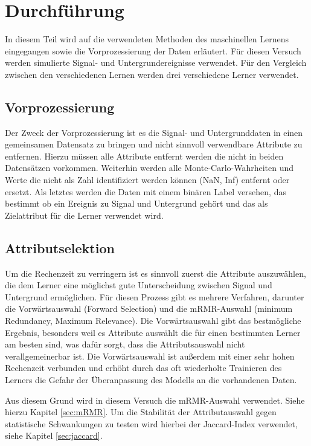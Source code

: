 \section{Durchführung}
\label{sec:Durchführung}

In diesem Teil wird auf die verwendeten Methoden des maschinellen Lernens eingegangen sowie die Vorprozessierung der Daten erläutert.
Für diesen Versuch werden simulierte Signal- und Untergrundereignisse verwendet. 
Für den Vergleich zwischen den verschiedenen Lernen werden drei verschiedene Lerner verwendet.


\subsection{Vorprozessierung}
\label{sec:vorprozessierung}

Der Zweck der Vorprozessierung ist es die Signal- und Untergrunddaten in einen gemeinsamen Datensatz zu bringen und nicht sinnvoll verwendbare Attribute zu entfernen. 
Hierzu müssen alle Attribute entfernt werden die nicht in beiden Datensätzen vorkommen. 
Weiterhin werden alle Monte-Carlo-Wahrheiten und Werte die nicht als Zahl identifiziert werden können (NaN, Inf) entfernt oder ersetzt. 
Als letztes werden die Daten mit einem binären Label versehen, das bestimmt ob ein Ereignis zu Signal und Untergrund gehört und das als Zielattribut für die Lerner verwendet wird. 


\subsection{Attributselektion}
\label{sec:attselection}

Um die Rechenzeit zu verringern ist es sinnvoll zuerst die Attribute auszuwählen, die dem Lerner eine möglichst gute Unterscheidung zwischen Signal und Untergrund ermöglichen. 
Für diesen Prozess gibt es mehrere Verfahren, darunter die Vorwärtsauswahl (Forward Selection) und die mRMR-Auswahl (minimum Redundancy, Maximum Relevance). 
Die Vorwärtsauswahl gibt das bestmögliche Ergebnis, besonders weil es Attribute auswählt die für einen bestimmten Lerner am besten sind, was dafür sorgt, dass die Attributsauswahl nicht verallgemeinerbar ist.
Die Vorwärtsauswahl ist außerdem mit einer sehr hohen Rechenzeit verbunden und erhöht durch das oft wiederholte Trainieren des Lerners die Gefahr der Überanpassung des Modells an die vorhandenen Daten.

Aus diesem Grund wird in diesem Versuch die mRMR-Auswahl verwendet. 
Siehe hierzu Kapitel \ref{sec:mRMR}.
Um die Stabilität der Attributauswahl gegen statistische Schwankungen zu testen wird hierbei der Jaccard-Index verwendet, siehe Kapitel \ref{sec:jaccard}.



